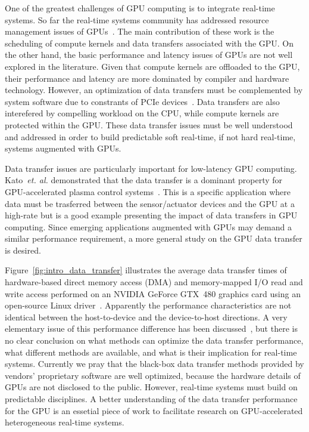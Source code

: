 One of the greatest challenges of GPU computing is to integrate
real-time systems.
So far the real-time systems community has addressed resource management
issues of GPUs~\cite{Basaran_ECRTS12, Elliott_RTS12, Elliott_ECRTS12,
Kato_ATC11, Kato_RTAS11, Kato_RTSS11}.
The main contribution of these work is the scheduling of compute
kernels and data transfers associated with the GPU.
On the other hand, the basic performance and latency issues of GPUs are
not well explored in the literature.
Given that compute kernels are offloaded to the GPU, their performance
and latency are more dominated by compiler and hardware technology.
However, an optimization of data transfers must be complemented by system
software due to constrants of PCIe devices~\cite{Kato_ATC12}.
Data transfers are also interefered by compelling workload on the CPU,
while compute kernels are protected within the GPU.
These data transfer issues must be well understood and addressed in
order to build predictable soft real-time, if not hard real-time,
systems augmented with GPUs.

Data transfer issues are particularly important for low-latency GPU
computing.
Kato~\textit{et. al.} demonstrated that the data transfer is a dominant
property for GPU-accelerated plasma control systems~\cite{Kato_ICCPS13}.
This is a specific application where data must be trasferred between the
sensor/actuator devices and the GPU at a high-rate but is a good example
presenting the impact of data transfers in GPU computing.
Since emerging applications augmented with GPUs may demand a similar
performance requirement, a more general study on the GPU data transfer
is desired.

Figure~\ref{fig:intro_data_transfer} illustrates the average data
transfer times of hardware-based direct memory access (DMA) and
memory-mapped I/O read and write access performed on an NVIDIA GeForce
GTX~480 graphics card using an open-source Linux
driver~\cite{Kato_ATC12}.
Apparently the performance characteristics are not identical between the
host-to-device and the device-to-host directions.
A very elementary issue of this performance difference has been
discussed~\cite{Kato_ATC12}, but there is no clear conclusion on what
methods can optimize the data transfer performance, what different
methods are available, and what is their implication for real-time
systems.
Currently we pray that the black-box data transfer methods provided by
vendors' proprietary software are well optimized, because the hardware
details of GPUs are not disclosed to the public.
However, real-time systems must build on predictable disciplines.
A better understanding of the data transfer performance for the GPU is
an essetial piece of work to facilitate research on GPU-accelerated
heterogeneous real-time systems.

